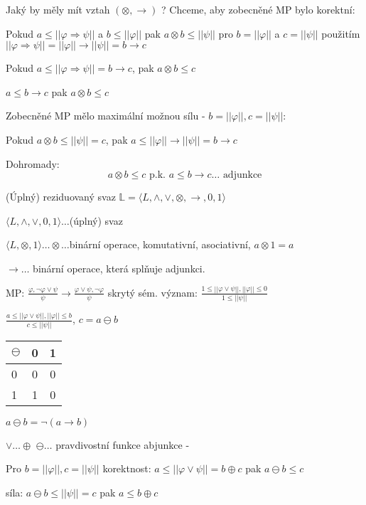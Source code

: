 \documentclass[10pt, a4paper, titlepage]{article}
\theoremstyle{note}
\newcommand{\pk}{\text{ p.k. }}
\newcommand{\rlat}{\langle L, \wedge, \vee,\otimes,\rightarrow,0,1\rangle}
\begin{document}
Jaký by měly mít vztah $(\otimes,\rightarrow)$ ? Chceme, aby zobecněné MP bylo korektní:

Pokud $a\leq||\varphi\Rightarrow\psi||$ a $b\leq||\varphi||$ pak $a\otimes b \leq||\psi||$ pro $b=||\varphi||$ a $c=||\psi||$ použitím $||\varphi\Rightarrow\psi||=||\varphi||\rightarrow||\psi||=b\rightarrow c$

Pokud $a\leq||\varphi\Rightarrow\psi|| = b\rightarrow c$, pak $a\otimes b\leq c$

$a\leq b\rightarrow c$ pak $a\otimes b \leq c$

Zobecněné MP mělo maximální možnou sílu - $b=||\varphi||, c=||\psi||$:

Pokud $a\otimes b\leq||\psi||=c$, pak $a\leq||\varphi||\rightarrow||\psi||=b\rightarrow c$

Dohromady: $$a\otimes b\leq c \pk a\leq b\rightarrow c \dots \text{ adjunkce}$$

(Úplný) reziduovaný svaz $\mathbb{L} = \rlat$

$\langle L, \wedge,\vee, 0, 1\rangle \dots$(úplný) svaz

$\langle L, \otimes, 1\rangle\dots\otimes\dots$binární operace, komutativní, asociativní, $a\otimes 1=a$

$\rightarrow\dots$ binární operace, která splňuje adjunkci.

\vspace{1cm}
MP: $\frac{\varphi, \neg\varphi\vee\psi}{\psi} \rightarrow \frac{\varphi\vee\psi, \neg\varphi}{\psi}$ skrytý sém. význam: $\frac{1\leq||\varphi\vee\psi||, ||\varphi||\leq 0}{1\leq||\psi||}$

$\frac{a\leq||\varphi\vee\psi||, ||\varphi||\leq b}{c\leq||\psi||}$, \hspace{2cm} $c=a\ominus b$ \hspace{2cm}   \begin{tabular}{l|*2c}
     \bf $\ominus$ & 0 & 1  \\
     \hline
    0 & 0& 0 \\
    1 & 1 & 0 \\
   \end{tabular} $a \ominus b = \neg(a\rightarrow b)$

$\vee\dots\oplus$\hspace{3cm} $\ominus\dots$ pravdivostní funkce abjunkce - 

Pro $b = ||\varphi||, c=||\psi||$ korektnost: $a\leq||\varphi\vee\psi|| = b\oplus c$ pak $a\ominus b\leq c$

síla: $a\ominus b \leq ||\psi||=c$ pak $a\leq b\oplus c$
\end{document}
